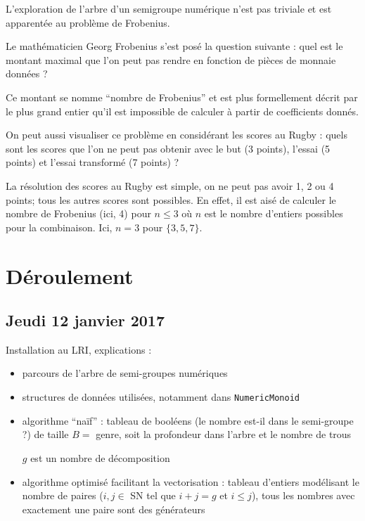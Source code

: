 \documentclass[12pt,a4paper]{article}
\let\leq\leqslant
\begin{document}
L'exploration de l'arbre d'un semigroupe numérique n'est pas triviale et est apparentée au problème de Frobenius.

Le mathématicien Georg Frobenius s'est posé la question suivante : quel est le montant maximal que l'on peut pas rendre en fonction de pièces de monnaie données ?

Ce montant se nomme ``nombre de Frobenius'' et est plus formellement décrit par le plus grand entier qu'il est impossible de calculer à partir de coefficients donnés.

On peut aussi visualiser ce problème en considérant les scores au Rugby : quels sont les scores que l'on ne peut pas obtenir avec le but (3 points), l'essai (5 points) et l'essai transformé (7 points) ?

La résolution des scores au Rugby est simple, on ne peut pas avoir 1, 2 ou 4 points; tous les autres scores sont possibles. En effet, il est aisé de calculer le nombre de Frobenius (ici, 4) pour $n \leq 3$ où $n$ est le nombre d'entiers possibles pour la combinaison. Ici, $n = 3$ pour $\{3,5,7\}$.

\section*{Déroulement}

\subsection*{Jeudi 12 janvier 2017}

Installation au LRI, explications :
\begin{itemize}
	\item	parcours de l'arbre de semi-groupes numériques

	\item	structures de données utilisées, notamment dans \texttt{NumericMonoid}

	\item	algorithme ``naïf'' : tableau de booléens (le nombre est-il dans le semi-groupe ?) de taille $B =$ genre, soit la profondeur dans l'arbre et le nombre de trous
			\begin{algorithmic}
								\STATE $g$ est un nombre de décomposition
							\ENDIF
						\ENDFOR
					\ENDIF
				\ENDFOR
			\end{algorithmic}

	\item	algorithme optimisé facilitant la vectorisation : tableau d'entiers modélisant le nombre de paires ($i, j \in$ SN tel que $i + j = g$ et $i \leq j$), tous les nombres avec exactement une paire sont des générateurs
\end{itemize}
\end{document}
